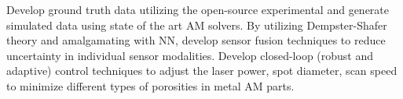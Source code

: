 \documentclass[12pt]{article}
\begin{document}
\begin{outline}[enumerate]
    \1 Develop ground truth data utilizing the open-source experimental and generate simulated data using state of the art AM solvers. 
    \1 By utilizing Dempster-Shafer theory and amalgamating with NN, develop sensor fusion techniques to reduce uncertainty in individual sensor modalities.
    \1 Develop closed-loop (robust and adaptive) control techniques to adjust the laser power, spot diameter, scan speed  to minimize different types of porosities in metal AM parts.
\end{outline}
%
%
\end{document}
